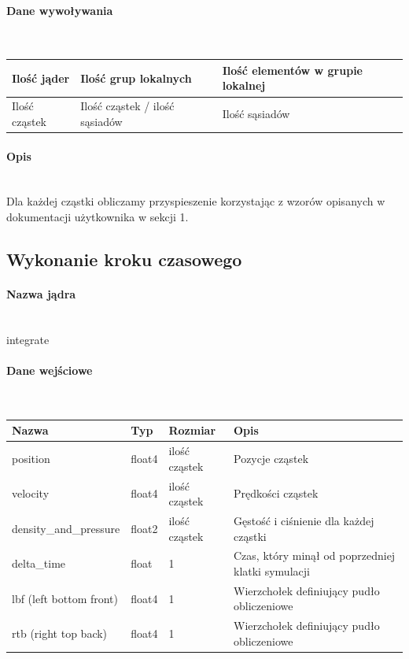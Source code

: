 \documentclass[polish, 12pt]{aghthesis}
\begin{document}
				\paragraph{Dane wywoływania} \ \\
					\begin{tabular}{| p{} | p{} | p{}|}
					\hline
						Ilość jąder & Ilość grup lokalnych & Ilość elementów w grupie lokalnej \\
					\hline
						Ilość cząstek & Ilość cząstek / ilość sąsiadów & Ilość sąsiadów \\ 
					\hline
					\end{tabular}
				\paragraph{Opis} \ \\
					\indent Dla każdej cząstki obliczamy przyspieszenie korzystając z wzorów opisanych w dokumentacji użytkownika w sekcji 1.
		\subsection{Wykonanie kroku czasowego}
				\paragraph{Nazwa jądra} \ \\
					integrate
				\paragraph{Dane wejściowe} \ \\
					\begin{tabular}{| p{} | p{} | p{} | p{} |}
					\hline
						Nazwa & Typ & Rozmiar & Opis \\
					\hline
						position & float4 & ilość cząstek & Pozycje cząstek \\
					\hline
						velocity & float4 & ilość cząstek & Prędkości cząstek \\
					\hline
						density\_and\_pressure & float2 & ilość cząstek & Gęstość i ciśnienie dla każdej cząstki\\
					\hline
						delta\_time & float & 1 & Czas, który minął od poprzedniej klatki symulacji \\ 
					\hline
						lbf (left bottom front)& float4 & 1 & Wierzchołek definiujący pudło obliczeniowe \\ 
					\hline
						rtb (right top back) & float4 & 1 & Wierzchołek definiujący pudło obliczeniowe  \\ 
					\hline
				\end{tabular}
\end{document}

